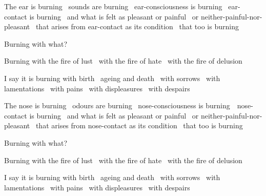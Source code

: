 \begin{english-only-hang}
  The ear is burning \breathmark\ sounds are burning \breathmark\ ear-consciousness is burning \breathmark\ ear-contact is burning \breathmark\ and what is felt as pleasant or painful \breathmark\ or neither-painful-nor-pleasant \breathmark\ that arises from ear-contact as its condition \breathmark\ that too is burning
\end{english-only-hang}
\begin{english-only-hangtogether}
  Burning with what?
\end{english-only-hangtogether}
\begin{english-only-hangtogether}
  Burning with the fire of lust \breathmark\ with the fire of hate \breathmark\ with the fire of delusion
\end{english-only-hangtogether}
\begin{english-only-hangtogether}
  I say it is burning with birth \breathmark\ ageing and death \breathmark\ with sorrows \breathmark\ with lamentations \breathmark\ with pains \breathmark\ with displeasures \breathmark\ with despairs
\end{english-only-hangtogether}

\begin{english-only-hang}
  The nose is burning \breathmark\ odours are burning \breathmark\ nose-consciousness is \mbox{burning}~\breathmark\ nose-contact is burning \breathmark\ and what is felt as pleasant or painful \breathmark\ or neither-painful-nor-pleasant \breathmark\ that arises from nose-contact as its condition \breathmark\ that too is burning
\end{english-only-hang}
\begin{english-only-hangtogether}
  Burning with what?
\end{english-only-hangtogether}
\begin{english-only-hangtogether}
  Burning with the fire of lust \breathmark\ with the fire of hate \breathmark\ with the fire of delusion
\end{english-only-hangtogether}
\begin{english-only-hangtogether}
  I say it is burning with birth \breathmark\ ageing and death \breathmark\ with sorrows \breathmark\ with lamentations \breathmark\ with pains \breathmark\ with displeasures \breathmark\ with despairs
\end{english-only-hangtogether}

